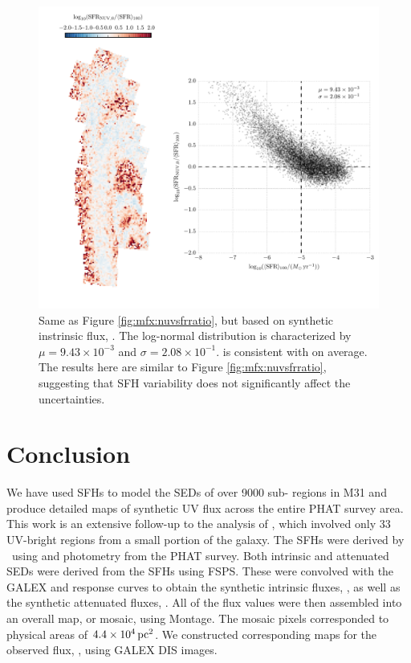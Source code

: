 \begin{figure}
\centering
\includegraphics[width=\textwidth]{m31flux-figures/sfr_nuv0-vs-mean.pdf}
\caption[Ratio of the \sfr{} based on the synthetic intrinsic \nuv{} flux to
the $100\myr$ mean \sfr{}.]{Same as Figure \ref{fig:mfx:nuvsfrratio}, but based
    on synthetic instrinsic flux, \sfrnuvz{}. The log-normal distribution is
    characterized by $\mu = 9.43\times 10^{-3}$ and $\sigma = 2.08\times
    10^{-1}$. \sfrnuvz{} is consistent with \sfroneh{} on average. The results
    here are similar to Figure \ref{fig:mfx:nuvsfrratio}, suggesting that SFH
    variability does not significantly affect the \sfrnuv{} uncertainties.
}
\label{fig:mfx:nuvzsfrratio}
\end{figure}



\section{Conclusion}\label{mfx:conclusion}

We have used SFHs to model the SEDs of over 9000 sub-\kpc{} regions in M31 and
produce detailed maps of synthetic UV flux across the entire PHAT survey area.
This work is an extensive follow-up to the analysis of \citet{Simones:2014},
which involved only 33 UV-bright regions from a small portion of the galaxy.
The SFHs were derived by \citet{Lewis:2014}\ using \acsb{} and \acsi{}
photometry from the PHAT survey. Both intrinsic and attenuated SEDs were
derived from the SFHs using FSPS. These were convolved with the GALEX \fuv{}
and \nuv{} response curves to obtain the synthetic intrinsic fluxes, \fxsfhz{},
as well as the synthetic attenuated fluxes, \fxsfh{}. All of the flux values
were then assembled into an overall map, or mosaic, using Montage. The mosaic
pixels corresponded to physical areas of $4.4\times 10^4\,\mathrm{pc}^2$. We constructed
corresponding maps for the observed flux, \fxobs{}, using GALEX DIS images.


